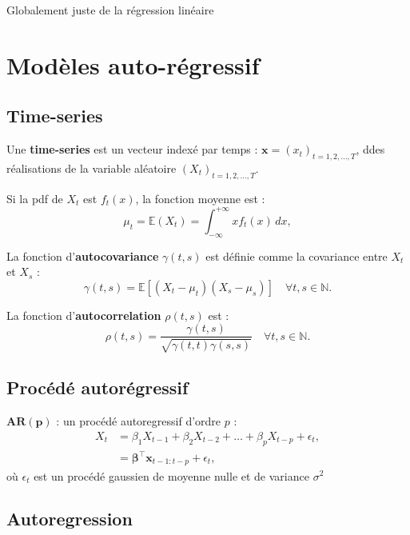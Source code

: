 \documentclass[12pt,a4paper]{article}
\begin{document}
Globalement juste de la régression linéaire


\section{Modèles auto-régressif}

\subsection{Time-series}

Une \textbf{time-series} est un vecteur indexé par temps : $\mathbf{x} = (x_t)_{t=1,2,\dots,T}$, ddes réalisations de la variable aléatoire $(X_t)_{t=1,2,\dots,T}$.

Si la pdf de $X_t$ est $f_t(x)$, la fonction moyenne est :
$$\mu_t = \mathbb{E}(X_t) = \int_{-\infty}^{+\infty} x f_t(x) \,dx ,$$

\medskip

La fonction d'\textbf{autocovariance} $\gamma(t,s)$ est définie comme la covariance entre $X_t$ et $X_s$ :
$$\gamma(t,s) = \mathbb{E}[(X_t - \mu_t)(X_s - \mu_s)] \quad \forall t, s \in \mathbb{N}.$$

La fonction d'\textbf{autocorrelation} $\rho(t,s)$ est :
$$\rho(t, s) = \frac{\gamma(t, s)}{\sqrt{\gamma(t, t)\gamma(s, s)}} \quad \forall t, s \in \mathbb{N}.$$

\subsection{Procédé autorégressif}

$\mathbf{AR(p)}$ : un procédé autoregressif d'ordre $p$ :
\begin{align*}
X_t &= \beta_1 X_{t-1} + \beta_2 X_{t-2} + \dots + \beta_p X_{t-p} + \epsilon_t , \\
    &= \boldsymbol{\beta}^\top \mathbf{x}_{t-1:t-p} + \epsilon_t ,
\end{align*}
où $\epsilon_t$ est un procédé gaussien de moyenne nulle et de variance $\sigma^2$

\subsection{Autoregression}
\end{document}
